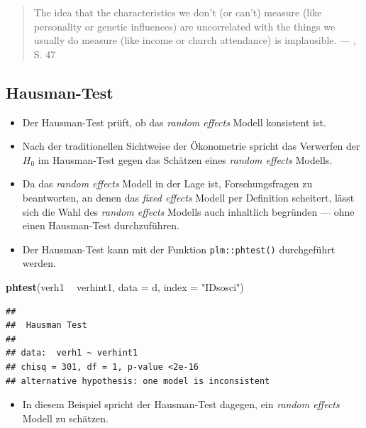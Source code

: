 \documentclass[
]{book}
\newenvironment{Shaded}{\begin{snugshade}}{\end{snugshade}}
\newcommand{\DataTypeTok}[1]{\textcolor[rgb]{0.13,0.29,0.53}{#1}}
\newcommand{\KeywordTok}[1]{\textcolor[rgb]{0.13,0.29,0.53}{\textbf{#1}}}
\newcommand{\NormalTok}[1]{#1}
\newcommand{\OperatorTok}[1]{\textcolor[rgb]{0.81,0.36,0.00}{\textbf{#1}}}
\newcommand{\StringTok}[1]{\textcolor[rgb]{0.31,0.60,0.02}{#1}}
\providecommand{\tightlist}{%
  \setlength{\itemsep}{0pt}\setlength{\parskip}{0pt}}
\begin{document}
\begin{quote}
The idea that the characteristics we don't (or can't) measure (like personality or genetic influences) are uncorrelated with the things we usually do measure (like income or church attendance) is implausible. --- \citet{vaiseyWhatYouCan2017}, S. 47
\end{quote}

\hypertarget{hausman-test}{%
\subsection*{Hausman-Test}\label{hausman-test}}

\begin{itemize}
\tightlist
\item
  Der Hausman-Test prüft, ob das \emph{random effects} Modell konsistent ist.
\item
  Nach der traditionellen Sichtweise der Ökonometrie spricht das Verwerfen der \(H_0\) im Hausman-Test gegen das Schätzen eines \emph{random effects} Modells.
\item
  Da das \emph{random effects} Modell in der Lage ist, Forschungsfragen zu beantworten, an denen das \emph{fixed effects} Modell per Definition scheitert, lässt sich die Wahl des \emph{random effects} Modells auch inhaltlich begründen --- ohne einen Hausman-Test durchzuführen.
\item
  Der Hausman-Test kann mit der Funktion \texttt{plm::phtest()} durchgeführt werden.
\end{itemize}

\begin{Shaded}
\begin{Highlighting}[]
\KeywordTok{phtest}\NormalTok{(verh1 }\OperatorTok{~}\StringTok{ }\NormalTok{verhint1, }\DataTypeTok{data =}\NormalTok{ d, }\DataTypeTok{index =} \StringTok{"IDsosci"}\NormalTok{)}
\end{Highlighting}
\end{Shaded}

\begin{verbatim}
## 
##  Hausman Test
## 
## data:  verh1 ~ verhint1
## chisq = 301, df = 1, p-value <2e-16
## alternative hypothesis: one model is inconsistent
\end{verbatim}

\begin{itemize}
\tightlist
\item
  In diesem Beispiel spricht der Hausman-Test dagegen, ein \emph{random effects} Modell zu schätzen.
\end{itemize}
\end{document}

